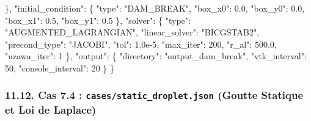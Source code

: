 \documentclass[
  french,
]{article}
\newenvironment{Shaded}{}{}
\newcommand{\DataTypeTok}[1]{\textcolor[rgb]{0.56,0.13,0.00}{#1}}
\newcommand{\DecValTok}[1]{\textcolor[rgb]{0.25,0.63,0.44}{#1}}
\newcommand{\FloatTok}[1]{\textcolor[rgb]{0.25,0.63,0.44}{#1}}
\newcommand{\FunctionTok}[1]{\textcolor[rgb]{0.02,0.16,0.49}{#1}}
\newcommand{\StringTok}[1]{\textcolor[rgb]{0.25,0.44,0.63}{#1}}
\begin{document}
\begin{Shaded}
\begin{Highlighting}[]
  \FunctionTok{\},}
  \DataTypeTok{"initial\_condition"}\FunctionTok{:} \FunctionTok{\{}
    \DataTypeTok{"type"}\FunctionTok{:} \StringTok{"DAM\_BREAK"}\FunctionTok{,}
    \DataTypeTok{"box\_x0"}\FunctionTok{:} \FloatTok{0.0}\FunctionTok{,} \DataTypeTok{"box\_y0"}\FunctionTok{:} \FloatTok{0.0}\FunctionTok{,} \DataTypeTok{"box\_x1"}\FunctionTok{:} \FloatTok{0.5}\FunctionTok{,} \DataTypeTok{"box\_y1"}\FunctionTok{:} \FloatTok{0.5}
  \FunctionTok{\},}
  \DataTypeTok{"solver"}\FunctionTok{:} \FunctionTok{\{}
    \DataTypeTok{"type"}\FunctionTok{:} \StringTok{"AUGMENTED\_LAGRANGIAN"}\FunctionTok{,}
    \DataTypeTok{"linear\_solver"}\FunctionTok{:} \StringTok{"BICGSTAB2"}\FunctionTok{,}
    \DataTypeTok{"precond\_type"}\FunctionTok{:} \StringTok{"JACOBI"}\FunctionTok{,}
    \DataTypeTok{"tol"}\FunctionTok{:} \FloatTok{1.0e{-}5}\FunctionTok{,} \DataTypeTok{"max\_iter"}\FunctionTok{:} \DecValTok{200}\FunctionTok{,} \DataTypeTok{"r\_al"}\FunctionTok{:} \FloatTok{500.0}\FunctionTok{,} \DataTypeTok{"uzawa\_iter"}\FunctionTok{:} \DecValTok{1}
  \FunctionTok{\},}
  \DataTypeTok{"output"}\FunctionTok{:} \FunctionTok{\{} \DataTypeTok{"directory"}\FunctionTok{:} \StringTok{"output\_dam\_break"}\FunctionTok{,} \DataTypeTok{"vtk\_interval"}\FunctionTok{:} \DecValTok{50}\FunctionTok{,} \DataTypeTok{"console\_interval"}\FunctionTok{:} \DecValTok{20} \FunctionTok{\}}
\FunctionTok{\}}
\end{Highlighting}
\end{Shaded}

\subsubsection{\texorpdfstring{11.12. Cas 7.4 :
\texttt{cases/static\_droplet.json} (Goutte Statique et Loi de
Laplace)}{11.12. Cas 7.4 : cases/static\_droplet.json (Goutte Statique et Loi de Laplace)}}\label{cas-7.4-casesstatic_droplet.json-goutte-statique-et-loi-de-laplace}
\end{document}
